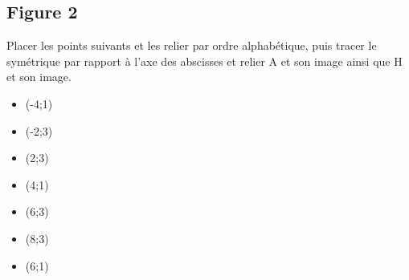 \subsection{Figure 2}


\begin{figure}[H]
        \center
\end{figure}

Placer les points suivants et les relier par ordre alphabétique, puis tracer le symétrique par rapport à l'axe des abscisses et relier A et son image ainsi que H et son image.


\setcounter{ptcntr}{0}

\begin{multicols}{4}
    \begin{itemize}
        \item \pt(-4;1)
        \item \pt(-2;3)
        \item \pt(2;3)
        \item \pt(4;1)
        \item \pt(6;3)
        \item \pt(8;3)
        \item \pt(6;1)
    \end{itemize}
\end{multicols}